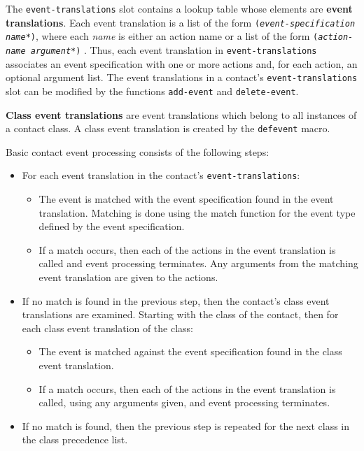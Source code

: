 The {\tt event-translations} slot contains a lookup
table\footnotemark{}
whose elements
are {\bf event translations}. Each event
translation is a list of the form {\tt ({\em event-specification} {\em name*})},
where each {\em name} is either an action name or a list of
the form {\tt ({\em action-name argument*})} . 
Thus, each event translation in {\tt event-translations} associates  an event
specification with one or more actions and, 
for each action, an optional argument
list.  The event translations in a contact's {\tt event-translations} slot can
be modified by the functions {\tt add-event} and {\tt delete-event}.


{\bf Class event translations} are event translations which
belong to all instances of a contact class. A class event translation is created by
the {\tt defevent} macro.

Basic contact event processing consists of the following steps:
\begin{itemize}
\item For each event translation in the contact's {\tt event-translations}:
\begin{itemize}
\item The event is matched with the event specification found in the event
translation. Matching is done using the match function for the event type defined by
the event specification.
\item If a match occurs, then each of
the actions in the event translation is called and event processing terminates.
Any arguments from the matching event translation are given to the actions.
\end{itemize}
\item If no match is found in the previous step, then the contact's class event
translations are examined. Starting with the class of the contact, then for each
class event translation of the class: 
\begin{itemize}
\item The event is matched against the event specification found in the class
event translation. 
\item If a match occurs, then each of
the actions in the event translation is called, using any arguments given, and 
event processing terminates.
\end{itemize}
\item If no match is found, then the previous step is repeated for the next
class in the class precedence list.  
\end{itemize}
 

